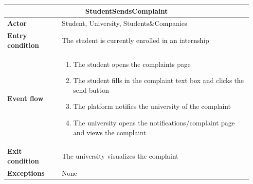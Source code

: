 \begin{enumerate}[label=\textbf{UC\arabic* -}]
\begin{table}[H]
    \centering
    \begin{tabular}{|l|m{10cm}|}
        \hline \multicolumn{2}{|c|}{\textbf{StudentSendsComplaint}} \\
        \hline \textbf{Actor} & Student, University, Students\&Companies \\
        \hline \textbf{Entry condition} & The student is currently enrolled in an internship \\
        \hline \textbf{Event flow} &
            \begin{enumerate}[label=\arabic*]
                \item The student opens the complaints page
                \item The student fills in the complaint text box and clicks the send button
                \item The platform notifies the university of the complaint
                \item The university opens the notifications/complaint page and views the complaint
            \end{enumerate} \\
        \hline \textbf{Exit condition} & The university visualizes the complaint \\
        \hline \textbf{Exceptions} & None \\
        \hline
    \end{tabular}
\end{table}

\begin{figure}[H]
    \centering
\end{figure}


\end{enumerate}
